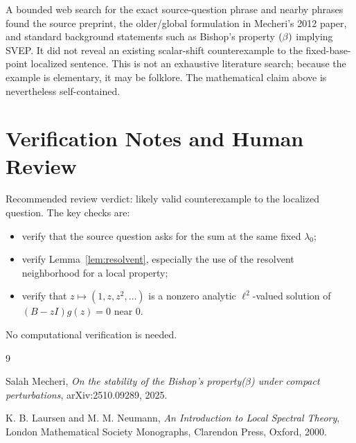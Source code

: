 \documentclass[11pt]{article}
\newcommand{\bprop}{\textup{(}\beta\textup{)}}
\begin{document}
A bounded web search for the exact source-question phrase and nearby phrases
found the source preprint, the older/global formulation in Mecheri's 2012
paper, and standard background statements such as Bishop's property
\(\bprop\) implying SVEP.  It did not reveal an existing scalar-shift
counterexample to the fixed-base-point localized sentence.  This is not an
exhaustive literature search; because the example is elementary, it may be
folklore.  The mathematical claim above is nevertheless self-contained.

\section*{Verification Notes and Human Review}

Recommended review verdict: likely valid counterexample to the localized
question.  The key checks are:

\begin{itemize}
\item verify that the source question asks for the sum at the same fixed
      \(\lambda_0\);
\item verify Lemma~\ref{lem:resolvent}, especially the use of the resolvent
      neighborhood for a local property;
\item verify that \(z\mapsto(1,z,z^2,\ldots)\) is a nonzero analytic
      \(\ell^2\)-valued solution of \((B-zI)g(z)=0\) near \(0\).
\end{itemize}

No computational verification is needed.

\begin{thebibliography}{9}

Salah Mecheri,
\emph{On the stability of the Bishop's property(\(\beta\)) under compact
perturbations},
arXiv:2510.09289, 2025.

K. B. Laursen and M. M. Neumann,
\emph{An Introduction to Local Spectral Theory},
London Mathematical Society Monographs, Clarendon Press, Oxford, 2000.

\end{thebibliography}
\end{document}
